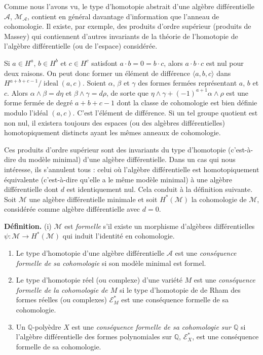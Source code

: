 \documentclass[
  french,
  a3paper,
  a3paper]{extarticle}
\begin{document}
Comme nous l'avons vu, le type d'homotopie abstrait d'une algèbre
différentielle \(\mathcal A\), \(\mathcal M_{\mathcal A}\), contient en
général davantage d'information que l'anneau de cohomologie. Il existe,
par exemple, des produits d'ordre supérieur (produits de Massey) qui
contiennent d'autres invariants de la théorie de l'homotopie de
l'algèbre différentielle (ou de l'espace) considérée.

Si \(a\in H^a\), \(b\in H^b\) et \(c\in H^c\) satisfont
\(a\cdot b=0=b\cdot c\), alors \(a\cdot b\cdot c\) est nul pour deux
raisons. On peut donc former un élément de différence
\(\langle a,b,c\rangle\) dans \(H^{a+b+c-1}/\operatorname{ideal}(a,c)\).
Soient \(\alpha\), \(\beta\) et \(\gamma\) des formes fermées
représentant \(a\), \(b\) et \(c\). Alors \(\alpha\wedge\beta=d\eta\) et
\(\beta\wedge\gamma=d\rho\), de sorte que
\(\eta\wedge\gamma+(-1)^{a+1}\alpha\wedge\rho\) est une forme fermée de
degré \(a+b+c-1\) dont la classe de cohomologie est bien définie modulo
l'idéal \((a,c)\). C'est l'élément de différence. Si un tel groupe
quotient est non nul, il existera toujours des espaces (ou des algèbres
différentielles) homotopiquement distincts ayant les mêmes anneaux de
cohomologie.

Ces produits d'ordre supérieur sont des invariants du type d'homotopie
(c'est-à-dire du modèle minimal) d'une algèbre différentielle. Dans un
cas qui nous intéresse, ils s'annulent tous : celui où l'algèbre
différentielle est homotopiquement équivalente (c'est-à-dire qu'elle a
le même modèle minimal) à une algèbre différentielle dont \(d\) est
identiquement nul. Cela conduit à la définition suivante. Soit
\(\mathcal M\) une algèbre différentielle minimale et soit
\(H^*(\mathcal M)\) la cohomologie de \(\mathcal M\), considérée comme
algèbre différentielle avec \(d=0\).

\textbf{Définition.} (i) \(\mathcal M\) est \emph{formelle} s'il existe
un morphisme d'algèbres différentielles
\(\psi:\mathcal M\longrightarrow H^*(\mathcal M)\) qui induit l'identité
en cohomologie.

\begin{enumerate}
\def\labelenumi{(\roman{enumi})}
\setcounter{enumi}{1}
\item
  Le type d'homotopie d'une algèbre différentielle \(\mathcal A\) est
  une \emph{conséquence formelle de sa cohomologie} si son modèle
  minimal est formel.
\item
  Le type d'homotopie réel (ou complexe) d'une variété \(M\) est une
  \emph{conséquence formelle de la cohomologie de \(M\)} si le type
  d'homotopie de de Rham des formes réelles (ou complexes)
  \(\mathcal E_M^*\) est une conséquence formelle de sa cohomologie.
\item
  Un \(\mathbb Q\)-polyèdre \(X\) est une \emph{conséquence formelle de
  sa cohomologie sur \(\mathbb Q\)} si l'algèbre différentielle des
  formes polynomiales sur \(\mathbb Q\), \(\mathcal E_X^*\), est une
  conséquence formelle de sa cohomologie.
\end{enumerate}
\end{document}
